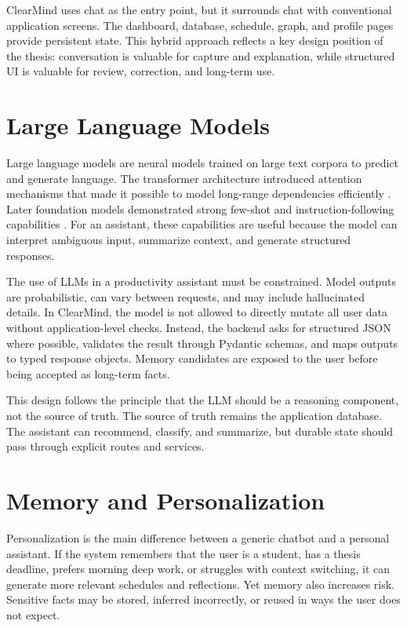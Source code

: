 ClearMind uses chat as the entry point, but it surrounds chat with conventional application screens. The dashboard, database, schedule, graph, and profile pages provide persistent state. This hybrid approach reflects a key design position of the thesis: conversation is valuable for capture and explanation, while structured UI is valuable for review, correction, and long-term use.

\section{Large Language Models}

Large language models are neural models trained on large text corpora to predict and generate language. The transformer architecture introduced attention mechanisms that made it possible to model long-range dependencies efficiently \cite{vaswani2017attention}. Later foundation models demonstrated strong few-shot and instruction-following capabilities \cite{brown2020language,bommasani2021foundation}. For an assistant, these capabilities are useful because the model can interpret ambiguous input, summarize context, and generate structured responses.

The use of LLMs in a productivity assistant must be constrained. Model outputs are probabilistic, can vary between requests, and may include hallucinated details. In ClearMind, the model is not allowed to directly mutate all user data without application-level checks. Instead, the backend asks for structured JSON where possible, validates the result through Pydantic schemas, and maps outputs to typed response objects. Memory candidates are exposed to the user before being accepted as long-term facts.

This design follows the principle that the LLM should be a reasoning component, not the source of truth. The source of truth remains the application database. The assistant can recommend, classify, and summarize, but durable state should pass through explicit routes and services.

\section{Memory and Personalization}

Personalization is the main difference between a generic chatbot and a personal assistant. If the system remembers that the user is a student, has a thesis deadline, prefers morning deep work, or struggles with context switching, it can generate more relevant schedules and reflections. Yet memory also increases risk. Sensitive facts may be stored, inferred incorrectly, or reused in ways the user does not expect.

